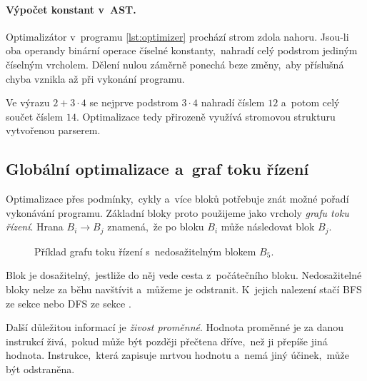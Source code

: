
\paragraph{Výpočet konstant v~AST.}

Optimalizátor v~programu \ref{lst:optimizer} prochází strom zdola nahoru. Jsou-li oba operandy binární operace číselné konstanty,~nahradí celý podstrom jediným číselným vrcholem. Dělení nulou záměrně ponechá beze změny,~aby příslušná chyba vznikla až při vykonání programu.



Ve výrazu $2+3\cdot4$ se nejprve podstrom $3\cdot4$ nahradí číslem $12$ a~potom celý součet číslem $14$. Optimalizace tedy přirozeně využívá stromovou strukturu vytvořenou parserem.

\subsection{Globální optimalizace a~graf toku řízení}

Optimalizace přes podmínky,~cykly a~více bloků potřebuje znát možné pořadí vykonávání programu. Základní bloky proto použijeme jako vrcholy \emph{grafu toku řízení}. Hrana $B_i\to B_j$ znamená,~že po bloku $B_i$ může následovat blok $B_j$.

\begin{figure}[h]
    \centering
    
    \caption{Příklad grafu toku řízení s~nedosažitelným blokem $B_5$.}
    \label{fig:graf-toku-rizeni}
\end{figure}

Blok je dosažitelný,~jestliže do něj vede cesta z~počátečního bloku. Nedosažitelné bloky nelze za běhu navštívit a~můžeme je odstranit. K~jejich nalezení stačí BFS ze sekce  nebo DFS ze sekce .

Další důležitou informací je \emph{živost proměnné}. Hodnota proměnné je za danou instrukcí živá,~pokud může být později přečtena dříve,~než ji přepíše jiná hodnota. Instrukce,~která zapisuje mrtvou hodnotu a~nemá jiný účinek,~může být odstraněna.

